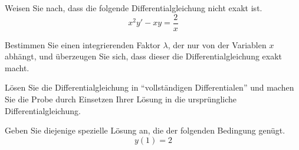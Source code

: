 \begin{atiTask}[
	title = Eine nichtexakte Differentialgleichung
]
	\begin{atiSubtasks}
		\item{
			Weisen Sie nach, dass die folgende Differentialgleichung nicht exakt ist.
			\[
				x^2y' - xy = \frac{2}{x}
			\]
		}
		\item{
			Bestimmen Sie einen integrierenden Faktor $\lambda$, der nur von der Variablen $x$ abhängt, und überzeugen Sie sich, dass dieser die Differentialgleichung exakt macht.
		}
		\item{
			Lösen Sie die Differentialgleichung in "`vollständigen Differentialen"' und machen Sie die Probe durch Einsetzen Ihrer Lösung in die ursprüngliche Differentialgleichung.
		}
		\item{
			Geben Sie diejenige spezielle Lösung an, die der folgenden Bedingung genügt.
			\[
				y(1) = 2
			\]
		}
	\end{atiSubtasks}
\end{atiTask}